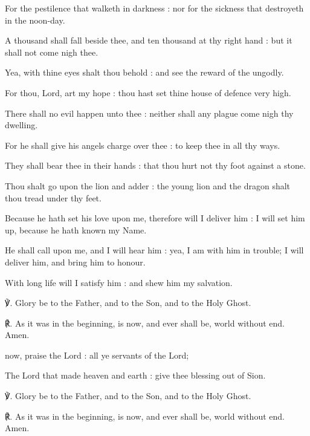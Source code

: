 For the pestilence that walketh in darkness : nor for the sickness that destroyeth in the noon-day.\par
{}A thousand shall fall beside thee, and ten thousand at thy right hand : but it shall not come nigh thee.\par
{}Yea, with thine eyes shalt thou behold : and see the reward of the ungodly.\par
{}For thou, Lord, art my hope : thou hast set thine house of defence very high.\par
{}There shall no evil happen unto thee : neither shall any plague come nigh thy dwelling.\par
{}For he shall give his angels charge over thee : to keep thee in all thy ways.\par
{}They shall bear thee in their hands : that thou hurt not thy foot against a stone.\par
{}Thou shalt go upon the lion and adder : the young lion and the dragon shalt thou tread under thy feet.\par
{}Because he hath set his love upon me, therefore will I deliver him : I will set him up, because he hath known my Name.\par
{}He shall call upon me, and I will hear him : yea, I am with him in trouble; I will deliver him, and bring him to honour.\par
{}With long life will I satisfy him : and shew him my salvation.\par
℣. Glory be to the Father, and to the Son, and to the Holy Ghost.\par
℟. As it was in the beginning, is now, and ever shall be, world without end. Amen.
\par
{}
 now, praise the Lord : all ye servants of the Lord;\par
{}
The Lord that made heaven and earth : give thee blessing out of Sion.\par
℣. Glory be to the Father, and to the Son, and to the Holy Ghost.\par
℟. As it was in the beginning, is now, and ever shall be, world without end. Amen.
\par
\vspace{-1\baselineskip}
